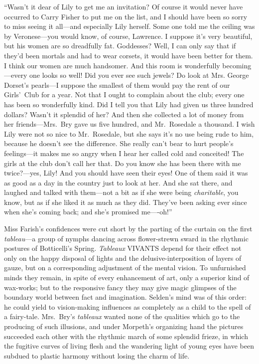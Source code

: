 \documentclass[12pt,a4paper]{book}
\begin{document}
``Wasn't it dear of Lily to get me an invitation? Of course
it would never have occurred to Carry Fisher to put me on
the list, and I should have been so sorry to miss seeing it
all---and especially Lily herself. Some one told me the ceiling was
by Veronese---you would know, of course, Lawrence. I suppose it's
very beautiful, but his women are so dreadfully fat. Goddesses? 
Well, I can only say that if they'd been mortals and had to wear
corsets, it would have been better for them. I think our women
are much handsomer. And this room is wonderfully becoming---every
one looks so well! Did you ever see such jewels? Do look at Mrs.
George Dorset's pearls---I suppose the smallest of them would pay
the rent of our Girls'\ Club for a year. Not that I ought to
complain about the club; every one has been so wonderfully kind. 
Did I tell you that Lily had given us three hundred dollars? 
Wasn't it splendid of her? And then she collected a lot of money
from her friends---Mrs.\ Bry gave us five hundred, and Mr.\ Rosedale
a thousand. I wish Lily were not so nice to Mr.\ Rosedale, but she
says it's no use being rude to him, because he doesn't see the
difference. She really can't bear to hurt people's feelings---it
makes me so angry when I hear her called cold and conceited! The
girls at the club don't call her that. Do you know she has been
there with me twice?---yes, Lily! And you should have seen their
eyes! One of them said it was as good as a day in the country
just to look at her. And she sat there, and laughed and talked
with them---not a bit as if she were being \textit{charitable}, you know,
but as if she liked it as much as they did. They've been asking
ever since when she's coming back; and she's promised me----oh!''





Miss Farish's confidences were cut short by the parting of the
curtain on the first \textit{tableau}---a group of nymphs dancing across
flower-strewn sward in the rhythmic postures of Botticelli's
Spring. \textit{Tableaux} VIVANTS depend for their effect not only on the
happy disposal of lights and the delusive-interposition of layers
of gauze, but on a corresponding adjustment of the mental vision. 
To unfurnished minds they remain, in spite of every enhancement
of art, only a superior kind of wax-works; but to the responsive
fancy they may give magic glimpses of the boundary world between
fact and imagination. Selden's mind was of this order: he could
yield to vision-making influences as completely as a child to the
spell of a fairy-tale. Mrs.\ Bry's \textit{tableaux} wanted none of
the qualities which go to the producing of such illusions, and
under Morpeth's organizing hand the pictures succeeded each other
with the rhythmic march of some splendid frieze, in which the
fugitive curves of living flesh and the wandering light of young
eyes have been subdued to plastic harmony without losing the
charm of life.
\end{document}
